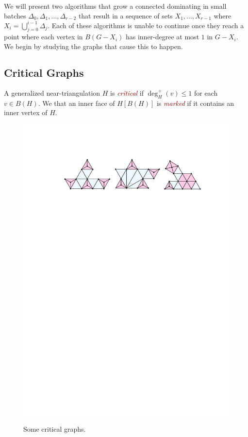 \documentclass[12pt]{article}
\newcommand{\defin}[1]{\emph{\textcolor{Maroon}{#1}}}
\theoremstyle{definition}
\begin{document}
We will present two algorithms that grow a connected dominating in small batches $\Delta_0,\Delta_1,\ldots,\Delta_{r-2}$ that result in a sequence of sets $X_1,\ldots,X_{r-1}$ where $X_{i}=\bigcup_{j=0}^{i-1}\Delta_j$.  Each of these algorithms is unable to continue once they reach a point where each vertex in $B(G-X_i)$ has inner-degree at most $1$ in $G-X_i$.  We begin by studying the graphs that cause this to happen.

\subsection{Critical Graphs}

A generalized near-triangulation $H$ is \defin{critical} if $\deg^+_H(v)\le 1$ for each $v\in B(H)$. We that an inner face of $H[B(H)]$ is \defin{marked} if it contains an inner vertex of $H$.

\begin{figure}[htbp]
    \begin{center}
        \includegraphics[page=1]{figs/critical} \\
    \end{center}
    \caption{Some critical graphs.}
    \label{critical_fig}
\end{figure}
\end{document}

